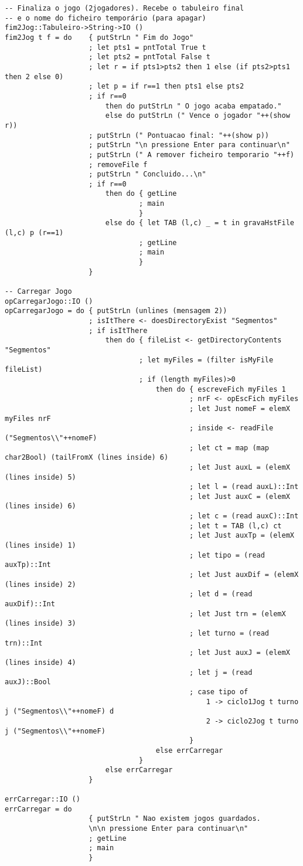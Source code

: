 \documentclass[a4paper,titlepage]{scrreprt}
\begin{document}
\begin{verbatim}
-- Finaliza o jogo (2jogadores). Recebe o tabuleiro final
-- e o nome do ficheiro temporário (para apagar)
fim2Jog::Tabuleiro->String->IO ()
fim2Jog t f = do	{ putStrLn " Fim do Jogo"
					; let pts1 = pntTotal True t
					; let pts2 = pntTotal False t
					; let r = if pts1>pts2 then 1 else (if pts2>pts1 then 2 else 0)
					; let p = if r==1 then pts1 else pts2
					; if r==0
						then do putStrLn " O jogo acaba empatado."
						else do	putStrLn (" Vence o jogador "++(show r))
					; putStrLn (" Pontuacao final: "++(show p))
					; putStrLn "\n pressione Enter para continuar\n"
					; putStrLn (" A remover ficheiro temporario "++f)
					; removeFile f
					; putStrLn " Concluido...\n"
					; if r==0
						then do	{ getLine
								; main
								}
						else do	{ let TAB (l,c) _ = t in gravaHstFile (l,c) p (r==1)
								; getLine
								; main
								}
					}

-- Carregar Jogo
opCarregarJogo::IO ()
opCarregarJogo = do	{ putStrLn (unlines (mensagem 2))
					; isItThere <- doesDirectoryExist "Segmentos"
					; if isItThere
						then do	{ fileList <- getDirectoryContents "Segmentos"
								; let myFiles = (filter isMyFile fileList)
								; if (length myFiles)>0
									then do	{ escreveFich myFiles 1
											; nrF <- opEscFich myFiles
											; let Just nomeF = elemX myFiles nrF
											; inside <- readFile ("Segmentos\\"++nomeF)
											; let ct = map (map char2Bool) (tailFromX (lines inside) 6)
											; let Just auxL = (elemX (lines inside) 5)
											; let l = (read auxL)::Int
											; let Just auxC = (elemX (lines inside) 6)
											; let c = (read auxC)::Int
											; let t = TAB (l,c) ct
											; let Just auxTp = (elemX (lines inside) 1)
											; let tipo = (read auxTp)::Int
											; let Just auxDif = (elemX (lines inside) 2)
											; let d = (read auxDif)::Int
											; let Just trn = (elemX (lines inside) 3)
											; let turno = (read trn)::Int
											; let Just auxJ = (elemX (lines inside) 4)
											; let j = (read auxJ)::Bool
											; case tipo of
												1 -> ciclo1Jog t turno j ("Segmentos\\"++nomeF) d
												2 -> ciclo2Jog t turno j ("Segmentos\\"++nomeF)
											}
									else errCarregar
								}
						else errCarregar
					}

errCarregar::IO ()
errCarregar = do	
					{ putStrLn " Nao existem jogos guardados.
					\n\n pressione Enter para continuar\n"
					; getLine
					; main
					}


\end{verbatim}
\end{document}
